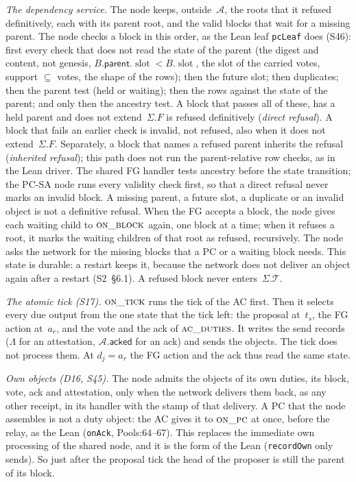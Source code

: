\documentclass{article}
\newcommand{\slot}{\operatorname{slot}}
\newcommand{\parent}{\mathsf{parent}}
\newcommand{\T}{\mathcal T}
\newcommand{\AC}{\mathcal A}
\newcommand{\acked}{\mathsf{acked}}
\newcommand{\nm}[1]{\nolinkurl{#1}}
\begin{document}
\emph{The dependency service.}  The node keeps, outside~$\AC$, the roots
that it refused definitively, each with its parent root, and the valid
blocks that wait for a missing parent.  The node checks a block in this
order, as the Lean leaf \nm{pcLeaf} does (S46): first every check that
does not read the state of the parent (the digest and content, not
genesis, $B.\parent.\slot<B.\slot$, the slot of the carried votes, support
$\subseteq$ votes, the shape of the rows); then the future slot; then
duplicates; then the parent test (held or waiting); then the rows against
the state of the parent; and only then the ancestry test.  A block that
passes all of these, has a held parent and does not extend~$\Sigma.F$ is
refused definitively (\emph{direct refusal}).  A block that fails an
earlier check is invalid, not refused, also when it does not
extend~$\Sigma.F$.  Separately, a block that names a refused parent
inherits the refusal (\emph{inherited refusal}); this path does not run
the parent-relative row checks, as in the Lean driver.  The shared FG
handler tests ancestry before the state transition; the PC-SA node runs
every validity check first, so that a direct refusal never marks an
invalid block.  A missing parent, a future slot, a duplicate or an invalid object
is not a definitive refusal.  When the FG accepts a block, the node gives
each waiting child to $\Call{on\_block}{}$ again, one block at a time; when
it refuses a root, it marks the waiting children of that root as refused,
recursively.  The node asks the network for the missing blocks that a PC
or a waiting block needs.  This state is durable: a restart keeps it,
because the network does not deliver an object again after a restart
(S2~\S6.1).  A refused block never enters~$\Sigma.\T$.

\emph{The atomic tick (S17).}  $\Call{on\_tick}{}$ runs the tick of the AC
first.  Then it selects every due output from the one state that the tick
left: the proposal at~$t_s$, the FG action at~$a_r$, and the vote and the
ack of $\Call{ac\_duties}{}$.  It writes the send records ($\Lambda$ for an
attestation, $\AC.\acked$ for an ack) and sends the objects.  The tick
does not process them.  At $d_j=a_r$ the FG action and the ack thus read
the same state.

\emph{Own objects (D16, S45).}  The node admits the objects of its own
duties, its block, vote, ack and attestation, only when the network
delivers them back, as any other receipt, in its handler with the stamp of
that delivery.  A PC that the node assembles is not a duty object: the AC
gives it to $\Call{on\_pc}{}$ at once, before the relay, as the Lean
(\nm{onAck}, Pools:64--67).  This replaces
the immediate own processing of the shared node, and it is the form of
the Lean (\nm{recordOwn} only sends).  So just after the proposal tick the
head of the proposer is still the parent of its block.
\end{document}
